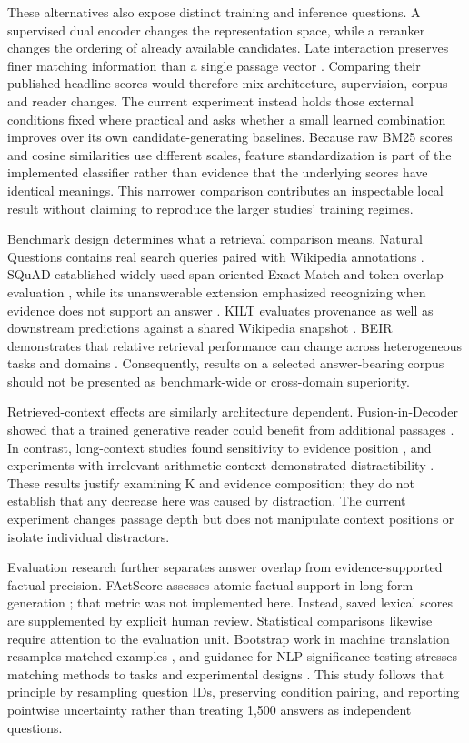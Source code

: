 \documentclass[
  11pt,
]{article}
\begin{document}
These alternatives also expose distinct training and inference
questions. A supervised dual encoder changes the representation space,
while a reranker changes the ordering of already available candidates.
Late interaction preserves finer matching information than a single
passage vector \citep{dpr, colbert, luan}. Comparing their published
headline scores would therefore mix architecture, supervision, corpus
and reader changes. The current experiment instead holds those external
conditions fixed where practical and asks whether a small learned
combination improves over its own candidate-generating baselines.
Because raw BM25 scores and cosine similarities use different scales,
feature standardization is part of the implemented classifier rather
than evidence that the underlying scores have identical meanings. This
narrower comparison contributes an inspectable local result without
claiming to reproduce the larger studies' training regimes.

Benchmark design determines what a retrieval comparison means. Natural
Questions contains real search queries paired with Wikipedia annotations
\citep{nq}. SQuAD established widely used span-oriented Exact Match and
token-overlap evaluation \citep{squad}, while its unanswerable extension
emphasized recognizing when evidence does not support an answer
\citep{squad2}. KILT evaluates provenance as well as downstream
predictions against a shared Wikipedia snapshot \citep{kilt}. BEIR
demonstrates that relative retrieval performance can change across
heterogeneous tasks and domains \citep{beir}. Consequently, results on a
selected answer-bearing corpus should not be presented as benchmark-wide
or cross-domain superiority.

Retrieved-context effects are similarly architecture dependent.
Fusion-in-Decoder showed that a trained generative reader could benefit
from additional passages \citep{fid}. In contrast, long-context studies
found sensitivity to evidence position \citep{lost_middle}, and
experiments with irrelevant arithmetic context demonstrated
distractibility \citep{distracted}. These results justify examining K
and evidence composition; they do not establish that any decrease here
was caused by distraction. The current experiment changes passage depth
but does not manipulate context positions or isolate individual
distractors.

Evaluation research further separates answer overlap from
evidence-supported factual precision. FActScore assesses atomic factual
support in long-form generation \citep{factscore}; that metric was not
implemented here. Instead, saved lexical scores are supplemented by
explicit human review. Statistical comparisons likewise require
attention to the evaluation unit. Bootstrap work in machine translation
resamples matched examples \citep{koehn}, and guidance for NLP
significance testing stresses matching methods to tasks and experimental
designs \citep{dror}. This study follows that principle by resampling
question IDs, preserving condition pairing, and reporting pointwise
uncertainty rather than treating 1,500 answers as independent questions.
\end{document}
